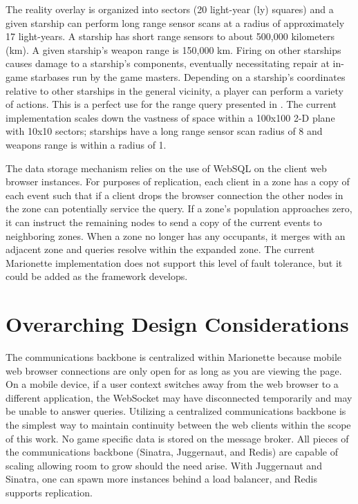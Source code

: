 \documentclass[12pt]{report}	%
\theoremstyle{definition}
\theoremstyle{remark}
\begin{document}
The reality overlay is organized into sectors (20 light-year (ly)
squares) and a given starship can perform long range sensor scans at a
radius of approximately 17 light-years. A starship has short range
sensors to about 500,000 kilometers (km). A given starship's weapon
range is 150,000 km. Firing on other starships causes damage to a starship's
components, eventually necessitating repair at in-game starbases run by
the game masters. Depending on a starship's coordinates relative to
other starships in the general vicinity, a player can perform a variety of
actions. This is a perfect use for the range query presented in
\cite{zio2011p2p}. The current implementation scales
down the vastness of space within a 100x100 2-D plane with 10x10
sectors; starships have a long range sensor scan radius of 8 and weapons
range is within a radius of 1.

The data storage mechanism relies on the use of WebSQL on the client web
browser instances. For purposes of replication, each client in a zone has
a copy of each event such that if a client drops the browser connection
the other nodes in the zone can potentially service the query. If a
zone's population approaches zero, it can instruct the remaining nodes to 
send a copy of the current events to neighboring zones. When a zone no longer 
has any occupants, it merges with an adjacent zone and queries resolve within 
the expanded zone. The current Marionette implementation does
not support this level of fault tolerance, but it could be added as the
framework develops.

\chapter{Overarching Design Considerations}

The communications backbone is centralized within Marionette because
mobile web browser connections are only open for as long as you are
viewing the page. On a mobile device, if a user context switches away from
the web browser to a different application, the WebSocket may have disconnected 
temporarily and may be unable to answer queries. Utilizing a 
centralized communications backbone
is the simplest way to maintain continuity between the web clients
within the scope of this work. No game specific data is stored on the
message broker. All pieces of the communications backbone (Sinatra,
Juggernaut, and Redis) are capable of scaling allowing room to grow 
should the need arise. With Juggernaut and Sinatra, one can spawn more 
instances behind a load balancer, and Redis supports replication.
\end{document}
